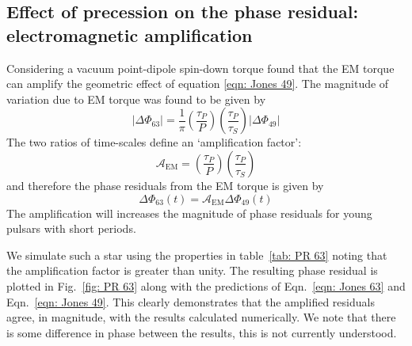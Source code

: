 \documentclass[../full_thesis/full_thesis.tex]{subfiles}
\begin{document}
\subsection{Effect of precession on the phase residual: electromagnetic amplification}
\label{sec: phase residual torqued}
Considering a vacuum point-dipole spin-down torque \citet{Jones2001} found that
the EM torque can amplify the geometric effect of equation \eqref{eqn: Jones
49}. The magnitude of variation due to EM torque was found to be given by
\begin{equation}
    |\Delta\Phi_{63}| = \frac{1}{\pi}\left(\frac{\tau_{P}}{P}\right)
    \left(\frac{\tau_{P}}{\tau_{S}}\right)
                                    |\Delta\Phi_{49}|
\label{eqn: Jones 63 mag}
\end{equation}
The two ratios of time-scales define an `amplification factor':
\begin{equation}
    \mathcal{A}_{\mathrm{EM}} = \left(\frac{\tau_{P}}{P}\right)
                                \left(\frac{\tau_{P}}{\tau_{S}}\right)
\label{eqn: EM amplification}
\end{equation}
and therefore the phase residuals from the EM torque is given by
\begin{equation}
\Delta\Phi_{63}(t) = \mathcal{A}_{\mathrm{EM}} \Delta\Phi_{49}(t)
\label{eqn: Jones 63}
\end{equation}
The amplification will increases
the magnitude of phase residuals for young pulsars with short periods.

We simulate such a star using the properties in table~\ref{tab: PR 63} noting
that the amplification factor is greater than unity.  The resulting phase
residual is plotted in Fig.~\ref{fig: PR 63} along with the predictions of
Eqn.~\eqref{eqn: Jones 63} and Eqn.~\eqref{eqn: Jones 49}. This clearly demonstrates
that the amplified residuals agree, in magnitude, with the results calculated
numerically. We note that there is some difference in phase between the results,
this is not currently understood.
\end{document}
